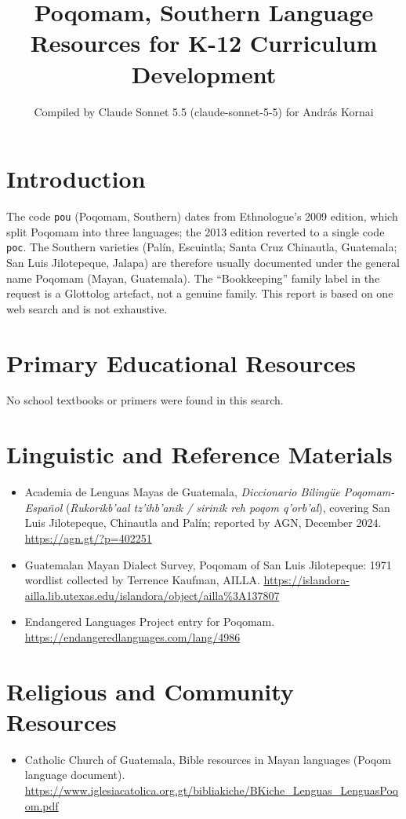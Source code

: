 \documentclass[12pt]{article}
\title{Poqomam, Southern Language Resources for K-12 Curriculum Development}
\author{Compiled by Claude Sonnet 5.5 (claude-sonnet-5-5) for Andr\'as Kornai}
\date{}
\begin{document}
\maketitle

\section{Introduction}
The code \texttt{pou} (Poqomam, Southern) dates from Ethnologue's 2009 edition, which split Poqomam into three languages; the 2013 edition reverted to a single code \texttt{poc}. The Southern varieties (Palín, Escuintla; Santa Cruz Chinautla, Guatemala; San Luis Jilotepeque, Jalapa) are therefore usually documented under the general name Poqomam (Mayan, Guatemala). The ``Bookkeeping'' family label in the request is a Glottolog artefact, not a genuine family. This report is based on one web search and is not exhaustive.

\section{Primary Educational Resources}
No school textbooks or primers were found in this search.

\section{Linguistic and Reference Materials}
\begin{itemize}
\item Academia de Lenguas Mayas de Guatemala, \emph{Diccionario Bilingüe Poqomam-Español} (\emph{Rukorikb'aal tz'ihb'anik / sirinik reh poqom q'orb'al}), covering San Luis Jilotepeque, Chinautla and Palín; reported by AGN, December 2024. \url{https://agn.gt/?p=402251}
\item Guatemalan Mayan Dialect Survey, Poqomam of San Luis Jilotepeque: 1971 wordlist collected by Terrence Kaufman, AILLA. \url{https://islandora-ailla.lib.utexas.edu/islandora/object/ailla%3A137807}
\item Endangered Languages Project entry for Poqomam. \url{https://endangeredlanguages.com/lang/4986}
\end{itemize}

\section{Religious and Community Resources}
\begin{itemize}
\item Catholic Church of Guatemala, Bible resources in Mayan languages (Poqom language document). \url{https://www.iglesiacatolica.org.gt/bibliakiche/BKiche_Lenguas_LenguasPoqom.pdf}
\end{itemize}
\end{document}
